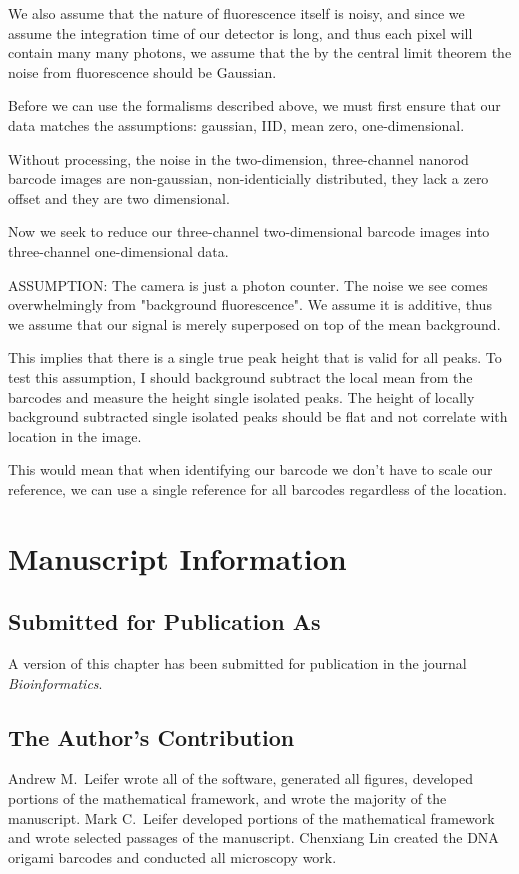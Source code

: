 We also assume that the nature of fluorescence itself is noisy, and since we assume the integration time of our detector is long, and thus each pixel will contain many many photons, we assume that the by the central limit theorem the noise from fluorescence should be Gaussian.






Before we can use the formalisms described above, we must first ensure that our data matches the assumptions: gaussian, IID, mean zero, one-dimensional. 

Without processing, the noise in the two-dimension, three-channel nanorod barcode images are non-gaussian, non-identicially distributed, they lack a zero offset and they are two dimensional.



Now we seek to reduce our three-channel two-dimensional barcode images into three-channel one-dimensional data. 








ASSUMPTION: The camera is just a photon counter. The noise we see comes overwhelmingly from "background fluorescence". We assume it is additive, thus we assume that our signal is merely superposed on top of the mean background. 

This implies that there is a single true peak height that is valid for all peaks. To test this assumption, I should background subtract the local mean from the barcodes and measure the height single isolated peaks. The height of locally background subtracted single isolated peaks should be flat and not correlate with location in the image.

This would mean that when identifying our barcode we don't have to scale our reference, we can use a single reference for all barcodes regardless of the location.


\section{Manuscript Information}
\subsection{Submitted for Publication As}
A version of this chapter has been submitted for publication in the journal \textit{Bioinformatics}.

\subsection{The Author's Contribution}
Andrew M.~Leifer wrote all of the software, generated all figures, developed portions of the mathematical framework, and wrote the majority of the manuscript. Mark C.~Leifer developed portions of the mathematical framework and wrote selected passages of the manuscript. Chenxiang Lin created the DNA origami barcodes and conducted all microscopy work. 
 